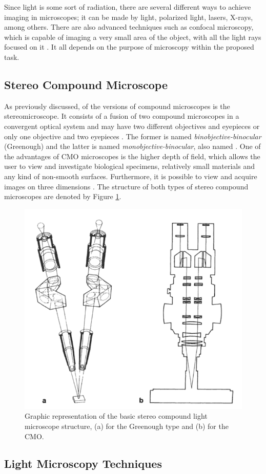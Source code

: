 Since light is some sort of radiation, there are several different ways to achieve imaging in microscopes; it can be made by light, polarized light, lasers, X-rays, among others. There are also advanced techniques such as confocal microscopy, which is capable of imaging a very small area of the object, with all the light rays focused on it \cite{rochow1994introduction}. It all depends on the purpose of microscopy within the proposed task.

\subsection{Stereo Compound Microscope}

As previously discussed, of the versions of compound microscopes is the stereomicroscope. It consists of a fusion of two compound microscopes in a convergent optical system and may have two different objectives and eyepieces or only one objective and two eyepieces \cite{schreier2004advances}. The former is named \emph{binobjective-binocular} (Greenough) and the latter is named \emph{monobjective-binocular}, also named . One of the advantages of CMO microscopes is the higher depth of field, which allows the user to view and investigate biological specimens, relatively small materials and any kind of non-smooth surfaces. Furthermore, it is possible to view and acquire images on three dimensions \cite{rochow1994introduction}. The structure of both types of stereo compound microscopes are denoted by Figure \ref{fig:stereo_compound_microscope}.

\begin{figure}[htb]
	\centering
	\caption{\label{fig:stereo_compound_microscope} Graphic representation of the basic stereo compound light microscope structure, (a) for the Greenough type and (b) for the CMO.}
	\begin{center}
	    \includegraphics[scale=0.45]{images/fig6.png}
	\end{center}
	\centering
\end{figure}


\subsection{Light Microscopy Techniques}
